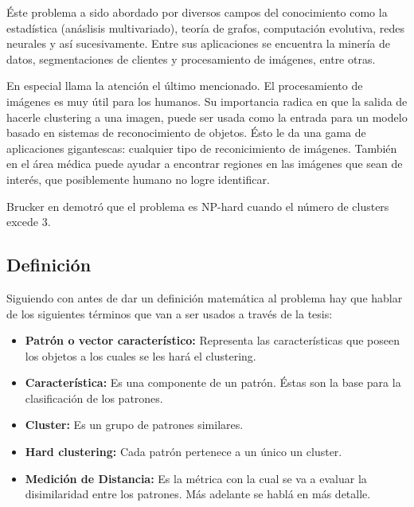 \'Este problema a sido abordado por diversos campos del conocimiento como la estad\'istica
(an\'aslisis multivariado), teor\'ia de grafos, computaci\'on evolutiva, redes neurales y
as\'i sucesivamente\cite{SwAjAm2009}. Entre sus aplicaciones se encuentra la miner\'ia de datos, 
segmentaciones de clientes y procesamiento de im\'agenes, entre otras. \cite{GaChJi2007}

En especial llama la atenci\'on el \'ultimo mencionado. El procesamiento de im\'agenes es muy \'util para los
humanos. Su importancia radica en que la salida de hacerle clustering a una imagen, puede ser usada como la entrada para 
un modelo basado en sistemas de reconocimiento de objetos.
\'Esto le da una gama de aplicaciones gigantescas: cualquier tipo de reconicimiento de im\'agenes.
Tambi\'en en el \'area m\'edica puede ayudar a encontrar regiones en las im\'agenes que sean de inter\'es,
que posiblemente humano no logre identificar.

Brucker en \cite{Br1978} demotr\'o que el problema es NP-hard cuando el n\'umero 
de clusters excede 3.

\subsection{Definici\'on} \label{sect:dclustdef} \label{sect:dclustd}

Siguiendo con \cite{SwAjAm2009} antes de dar un definici\'on matem\'atica al problema hay que hablar de 
los siguientes t\'erminos que van a ser usados a trav\'es de la tesis:

\begin{itemize}

\item {\bf Patr\'on o vector caracter\'istico:} Representa las
caracter\'isticas que poseen los objetos a los cuales se les har\'a el clustering.

\item {\bf Caracter\'istica:} Es una componente de un patr\'on. \'Estas son
la base para la clasificaci\'on de los patrones.

\item {\bf Cluster:} Es un grupo de patrones similares.

\item {\bf Hard clustering:} Cada patr\'on pertenece a un \'unico un cluster.

\item {\bf Medici\'on de Distancia:} Es la m\'etrica con la cual se va a evaluar
la disimilaridad entre los patrones. M\'as adelante se habl\'a en m\'as detalle.

\end{itemize}

